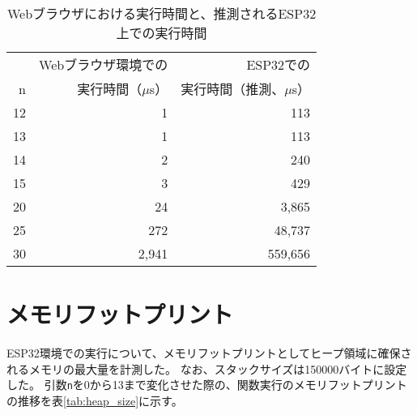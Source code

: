 \begin{table}[htbp]
  \caption{Webブラウザにおける実行時間と、推測されるESP32上での実行時間}
  \label{tab:fib_time_browser}
  \begin{center}
    \begin{tabular}{rrr}
      \hline
         & Webブラウザ環境での & ESP32での \\
       n & 実行時間（$\mu$s） & 実行時間（推測、$\mu$s） \\ \hline \hline
      12 &     1 &     113 \\ \hline
      13 &     1 &     113 \\ \hline
      14 &     2 &     240 \\ \hline
      15 &     3 &     429 \\ \hline
      20 &    24 &   3,865 \\ \hline
      25 &   272 &  48,737 \\ \hline
      30 & 2,941 & 559,656 \\ \hline
    \end{tabular}
  \end{center}
\end{table}

\section{メモリフットプリント}

ESP32環境での実行について、メモリフットプリントとしてヒープ領域に確保されるメモリの最大量を計測した。
なお、スタックサイズは150000バイトに設定した。
引数\verb|n|を0から13まで変化させた際の、関数実行のメモリフットプリントの推移を表\ref{tab:heap_size}に示す。


